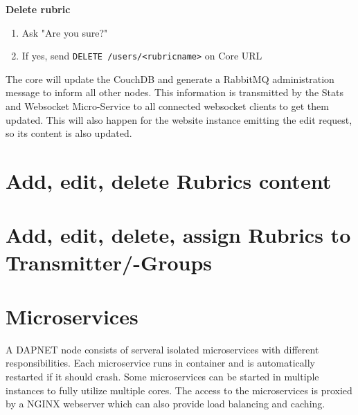 \textbf{Delete rubric}
\begin{enumerate}
\item Ask "Are you sure?"
\item If yes, send \texttt{DELETE /users/<rubricname>} on Core URL
\end{enumerate}

The core will update the CouchDB and generate a RabbitMQ administration message
to inform all other nodes. This information is transmitted by the Stats and
Websocket Micro-Service to all connected websocket clients to get them updated.
This will also happen for the website instance emitting the edit request, so its
content is also updated.

\section{Add, edit, delete Rubrics content}

\section{Add, edit, delete, assign Rubrics to Transmitter/-Groups}

\section{Microservices}

A DAPNET node consists of serveral isolated microservices with different
responsibilities. Each microservice runs in container and is automatically
restarted if it should crash. Some microservices can be started in multiple
instances to fully utilize multiple cores. The access to the microservices is
proxied by a NGINX webserver which can also provide load balancing and caching.

